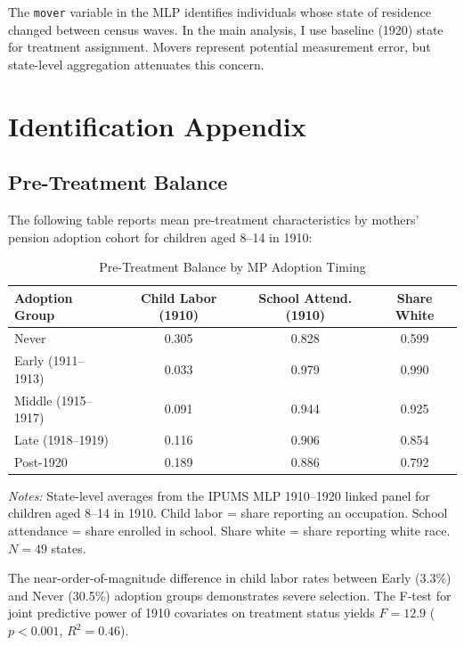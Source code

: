\documentclass[12pt]{article}
\begin{document}
The \texttt{mover} variable in the MLP identifies individuals whose state of residence changed between census waves. In the main analysis, I use baseline (1920) state for treatment assignment. Movers represent potential measurement error, but state-level aggregation attenuates this concern.

\section{Identification Appendix}

\subsection{Pre-Treatment Balance}

The following table reports mean pre-treatment characteristics by mothers' pension adoption cohort for children aged 8--14 in 1910:

\begin{table}[H]
\centering
\caption{Pre-Treatment Balance by MP Adoption Timing}
\begin{threeparttable}
\begin{tabular}{lccc}
\toprule
Adoption Group & Child Labor (1910) & School Attend. (1910) & Share White \\
\midrule
Never & 0.305 & 0.828 & 0.599 \\
Early (1911--1913) & 0.033 & 0.979 & 0.990 \\
Middle (1915--1917) & 0.091 & 0.944 & 0.925 \\
Late (1918--1919) & 0.116 & 0.906 & 0.854 \\
Post-1920 & 0.189 & 0.886 & 0.792 \\
\bottomrule
\end{tabular}
\begin{tablenotes}[flushleft]
\small
\item \textit{Notes:} State-level averages from the IPUMS MLP 1910--1920 linked panel for children aged 8--14 in 1910. Child labor = share reporting an occupation. School attendance = share enrolled in school. Share white = share reporting white race. $N = 49$ states.
\end{tablenotes}
\end{threeparttable}
\label{tab:balance}
\end{table}

The near-order-of-magnitude difference in child labor rates between Early (3.3\%) and Never (30.5\%) adoption groups demonstrates severe selection. The F-test for joint predictive power of 1910 covariates on treatment status yields $F = 12.9$ ($p < 0.001$, $R^2 = 0.46$).
\end{document}
